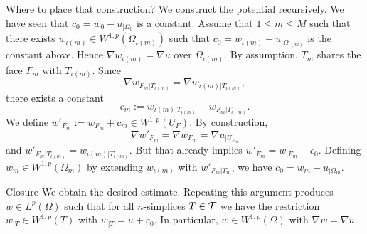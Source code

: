 \documentclass[10pt,a4paper]{article}
\newcommand{\mwl}[1]{{\color{red}#1}}
\begin{document}
    \mwl{Where to place that construction?}
 We construct the potential recursively. 
 We have seen that $c_{0} = w_{0} - u_{|\Omega_{0}}$ is a constant. 
 Assume that $1 \leq m \leq M$ such that there exists $w_{\iota(m)} \in W^{1,p}(\Omega_{\iota(m)})$ 
 such that $c_{0} = w_{\iota(m)} - u_{|\Omega_{\iota(m)}}$ is the constant above. 
 Hence $\nabla w_{\iota(m)} = \nabla u$ over $\Omega_{\iota(m)}$. 
 By assumption, $T_{m}$ shares the face $F_{m}$ with $T_{{\iota(m)}}$. 
 Since $$\nabla w_{F_{m}|T_{{\iota(m)}}} = \nabla w_{\iota(m)|T_{{\iota(m)}}},$$
 there exists a constant $$c_{m} := w_{\iota(m)|T_{{\iota(m)}}} - w_{F_{m}|T_{{\iota(m)}}}.$$
 We define $w'_{F_m} := w_{F_m} + c_{m} \in W^{1,p}(U_F)$.
 By construction, $$\nabla w'_{F_m} = \nabla w_{F_m} = \nabla u_{|U_{F_m}}$$ 
 and 
 $w'_{F_{m}|T_{{\iota(m)}}} = w_{\iota(m)|T_{{\iota(m)}}}$. 
 But that already implies $w'_{F_m} = w_{|F_m} - c_{0}$. 
 Defining $w_{m} \in W^{1,p}(\Omega_m)$ by extending $w_{\iota(m)}$ with $w'_{F_m|T_m}$,
 we have $c_{0} = w_{m} - u_{|\Omega_{m}}$. 

  
 
 \mwl{Closure}
 We obtain the desired estimate. 
 Repeating this argument produces $w \in L^{p}(\Omega)$ 
 such that for all $n$-simplices $T \in {\mathcal T}$ we have the restriction $w_{|T} \in W^{1,p}(T)$ with $w_{|T} = u + c_{0}$.
 In particular, $w \in W^{1,p}(\Omega)$ with $\nabla w = \nabla u$.
 
 
 
 
 
 
 
 
 
\end{document}
